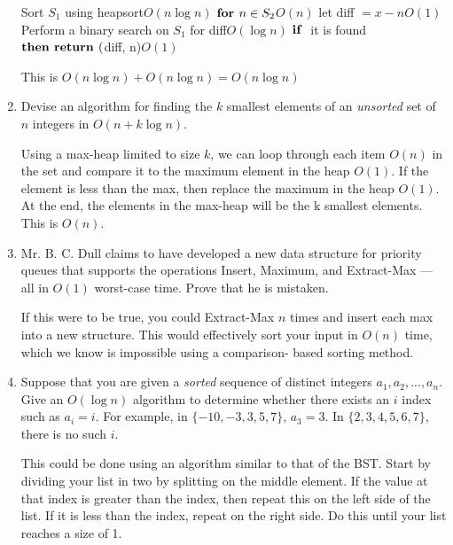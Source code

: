 \documentclass[12pt]{article}
\begin{document}
\begin{enumerate}
    \tabto{1cm}Sort $S_1$ using heapsort\tabto{11cm}$O(n \log n)$
    \tabto{1cm}$\mbox{\bf for\ } n \in S_2$\tabto{11cm}$O(n)$
    \tabto{2cm}let diff $= x-n$\tabto{11cm}$O(1)$
    \tabto{2cm}Perform a binary search on $S_1$ for diff\tabto{11cm}$O(\log n)$
    \tabto{2cm}$\mbox{\bf if\ }$ it is found $\mbox{\bf then\ } \mbox{\bf return\ } ($diff, n)\tabto{11cm}$O(1)$

    This is $O(n \log n) + O(n\log n) = O(n\log n)$

    \item Devise an algorithm for finding the $k$ smallest elements of an \emph{unsorted} set of $n$
    integers in $O(n + k \log n)$.  

    Using a max-heap limited to size $k$, we can loop through each item $O(n)$ in the set and compare it to the
    maximum element in the heap $O(1)$. If the element is less than the max, then replace the maximum in the heap
    $O(1)$. At the end, the elements in the max-heap will be the k smallest elements. This is $O(n)$.

    \item Mr. B. C. Dull claims to have developed a new data structure for priority queues
    that supports the operations Insert, Maximum, and Extract-Max — all in $O(1)$ worst-case time.
    Prove that he is mistaken.

    If this were to be true, you could Extract-Max $n$ times and insert each max into a new structure.
    This would effectively sort your input in $O(n)$ time, which we know is impossible using a comparison-
    based sorting method.

    \item Suppose that you are given a \emph{sorted} sequence of distinct integers ${a_1, a_2,...,a_n}$.
    Give an $O(\log n)$ algorithm to determine whether there exists an $i$ index such as $a_i = i$.
    For example, in $\{-10, -3, 3, 5, 7\}$, $a_3 = 3$. In $\{2, 3, 4, 5, 6, 7\}$, there is no such $i$.

    This could be done using an algorithm similar to that of the BST. Start by dividing your list in two
    by splitting on the middle element. If the value at that index is greater than the index, then repeat
    this on the left side of the list. If it is less than the index, repeat on the right side. Do this until
    your list reaches a size of 1.
\end{enumerate}
\end{document}
